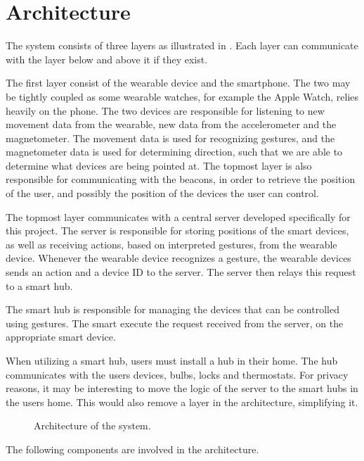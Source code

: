 \section{Architecture}\label{sec:architecture}
The system consists of three layers as illustrated in . 
Each layer can communicate with the layer below and above it if they exist.

The first layer consist of the wearable device and the smartphone. 
The two may be tightly coupled as some wearable watches, 
for example the Apple Watch, relies heavily on the phone. 
The two devices are responsible for listening to new movement data from the wearable, 
\eg new data from the accelerometer and the magnetometer.
The movement data is used for recognizing gestures, 
and the magnetometer data is used for determining direction, 
such that we are able to determine what devices are being pointed at. 
The topmost layer is also responsible for communicating with the beacons, 
in order to retrieve the position of the user, 
and possibly the position of the devices the user can control. 

The topmost layer communicates with a central server developed specifically for this project. 
The server is responsible for storing positions of the smart devices, 
as well as receiving actions, based on interpreted gestures, from the wearable device.
Whenever the wearable device recognizes a gesture, 
the wearable devices sends an action and a device ID to the server.
The server then relays this request to a smart hub. 

The smart hub is responsible for managing the devices that can be controlled using gestures. 
The smart execute the request received from the server, 
on the appropriate smart device. 

When utilizing a smart hub, users must install a hub in their home. 
The hub communicates with the users devices, \eg bulbs, locks and thermostats. 
For privacy reasons, it may be interesting to move the logic of the server to the smart hubs in the users home. 
This would also remove a layer in the architecture, simplifying it.

\begin{figure}[H]
  \centering
  
  \caption{Architecture of the system.}
  \label{fig:architecture}
\end{figure}

The following components are involved in the architecture.

